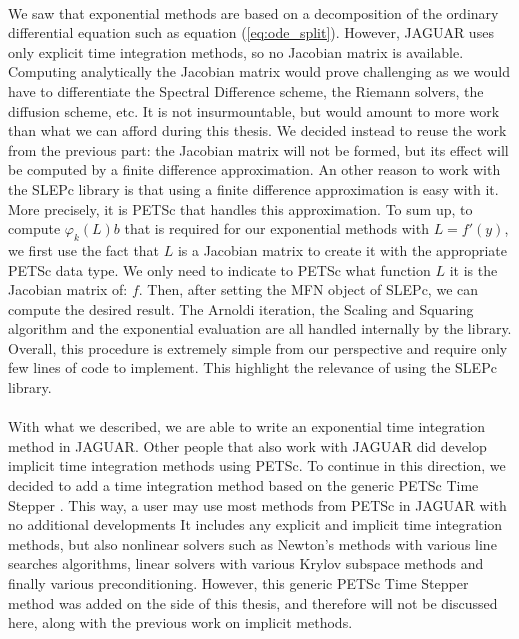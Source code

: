       \paragraph{}
      We saw that exponential methods are based on a decomposition of the ordinary differential equation such as equation (\ref{eq:ode_split}).
      However, JAGUAR uses only explicit time integration methods, so no Jacobian matrix is available.
      Computing analytically the Jacobian matrix would prove challenging as we would have to differentiate the Spectral Difference scheme, the Riemann solvers, the diffusion scheme, etc.
      It is not insurmountable, but would amount to more work than what we can afford during this thesis.
      We decided instead to reuse the work from the previous part: the Jacobian matrix will not be formed, but its effect will be computed by a finite difference approximation.
      An other reason to work with the SLEPc library is that using a finite difference approximation is easy with it.
      More precisely, it is PETSc that handles this approximation.
      To sum up, to compute $\varphi_k\left(L\right)b$ that is required for our exponential methods with $L = f'\left(y\right)$, we first use the fact that $L$ is a Jacobian matrix to create it with the appropriate PETSc data type.
      We only need to indicate to PETSc what function $L$ it is the Jacobian matrix of: $f$.
      Then, after setting the MFN object of SLEPc, we can compute the desired result.
      The Arnoldi iteration, the Scaling and Squaring algorithm and the exponential evaluation are all handled internally by the library.
      Overall, this procedure is extremely simple from our perspective and require only few lines of code to implement.
      This highlight the relevance of using the SLEPc library.

      \paragraph{}
      With what we described, we are able to write an exponential time integration method in JAGUAR.
      Other people that also work with JAGUAR did develop implicit time integration methods using PETSc.
      To continue in this direction, we decided to add a time integration method based on the generic PETSc Time Stepper \cite{AbhyankarBrownConstantinescuEtAl2018}.
      This way, a user may use most methods from PETSc in JAGUAR with no additional developments
      It includes any explicit and implicit time integration methods, but also nonlinear solvers such as Newton's methods with various line searches algorithms, linear solvers with various Krylov subspace methods and finally various preconditioning.
      However, this generic PETSc Time Stepper method was added on the side of this thesis, and therefore will not be discussed here, along with the previous work on implicit methods.


